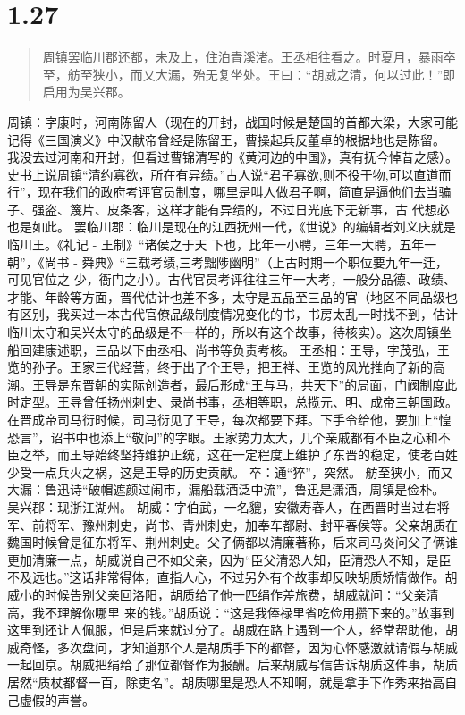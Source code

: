 \documentclass[]{book}
\begin{document}
\section{1.27}\label{section-26}

\begin{quote}
周镇罢临川郡还都，未及上，住泊青溪渚。王丞相往看之。时夏月，暴雨卒至，舫至狭小，而又大漏，殆无复坐处。王曰：``胡威之清，何以过此！''即启用为吴兴郡。
\end{quote}

周镇：字康时，河南陈留人（现在的开封，战国时候是楚国的首都大梁，大家可能记得《三国演义》中汉献帝曾经是陈留王，曹操起兵反董卓的根据地也是陈留。
我没去过河南和开封，但看过曹锦清写的《黄河边的中国》，真有抚今悼昔之感）。史书上说周镇``清约寡欲，所在有异绩。''古人说``君子寡欲,则不役于物,可以直道而行''，现在我们的政府考评官员制度，哪里是叫人做君子啊，简直是逼他们去当骗子、强盗、篾片、皮条客，这样才能有异绩的，不过日光底下无新事，古
代想必也是如此。
罢临川郡：临川是现在的江西抚州一代，《世说》的编辑者刘义庆就是临川王。《礼记
- 王制》``诸侯之于天 下也，比年一小聘，三年一大聘，五年一朝''，《尚书 -
舜典》``三载考绩,三考黜陟幽明''（上古时期一个职位要九年一迁，可见官位之
少，衙门之小）。古代官员考评往往三年一大考，一般分品德、政绩、才能、年龄等方面，晋代估计也差不多，太守是五品至三品的官（地区不同品级也有区别，我买过一本古代官僚品级制度情况变化的书，书房太乱一时找不到，估计临川太守和吴兴太守的品级是不一样的，所以有这个故事，待核实）。这次周镇坐船回建康述职，三品以下由丞相、尚书等负责考核。
王丞相：王导，字茂弘，王览的孙子。王家三代经营，终于出了个王导，把王祥、王览的风光推向了新的高潮。王导是东晋朝的实际创造者，最后形成``王与马，共天下''的局面，门阀制度此时定型。王导曾任扬州刺史、录尚书事，丞相等职，总揽元、明、成帝三朝国政。在晋成帝司马衍时候，司马衍见了王导，每次都要下拜。下手令给他，要加上``惶恐言''，诏书中也添上``敬问''的字眼。王家势力太大，几个亲戚都有不臣之心和不臣之举，而王导始终坚持维护正统，这在一定程度上维护了东晋的稳定，使老百姓少受一点兵火之祸，这是王导的历史贡献。
卒：通``猝''，突然。
舫至狭小，而又大漏：鲁迅诗``破帽遮颜过闹市，漏船载酒泛中流''，鲁迅是潇洒，周镇是俭朴。
吴兴郡：现浙江湖州。
胡威：字伯武，一名貔，安徽寿春人，在西晋时当过右将军、前将军、豫州刺史，尚书、青州刺史，加奉车都尉、封平春侯等。父亲胡质在魏国时候曾是征东将军、荆州刺史。父子俩都以清廉著称，后来司马炎问父子俩谁更加清廉一点，胡威说自己不如父亲，因为``臣父清恐人知，臣清恐人不知，是臣不及远也。''这话非常得体，直指人心，不过另外有个故事却反映胡质矫情做作。胡威小的时候告别父亲回洛阳，胡质给了他一匹绢作差旅费，胡威就问：``父亲清高，我不理解你哪里
来的钱。''胡质说：``这是我俸禄里省吃俭用攒下来的。''故事到这里到还让人佩服，但是后来就过分了。胡威在路上遇到一个人，经常帮助他，胡威奇怪，多次盘问，才知道那个人是胡质手下的都督，因为心怀感激就请假与胡威一起回京。胡威把绢给了那位都督作为报酬。后来胡威写信告诉胡质这件事，胡质居然``质杖都督一百，除吏名''。胡质哪里是恐人不知啊，就是拿手下作秀来抬高自己虚假的声誉。
\end{document}
